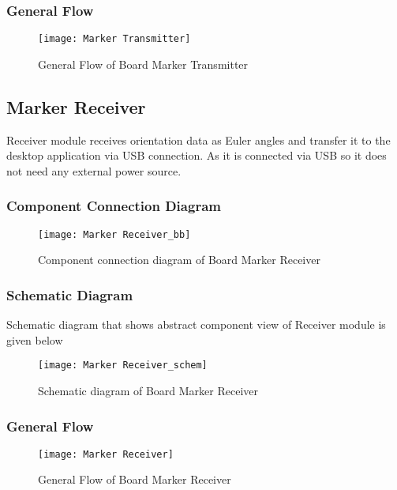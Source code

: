 \subsubsection{General Flow}

\begin{figure}[h]
  \centering
  \texttt{[image: Marker Transmitter]}
  \caption{General Flow of Board Marker Transmitter}
\end{figure}


\subsection{Marker Receiver}
Receiver module receives orientation data as Euler angles and transfer it to the desktop application via USB connection. As it is connected via USB so it does not need any external power source.

\subsubsection{Component Connection Diagram}

\begin{figure}[h]
  \centering
  \texttt{[image: Marker Receiver\_bb]}
  \caption{Component connection diagram of Board Marker Receiver}
\end{figure}

\subsubsection{Schematic Diagram}
Schematic diagram that shows abstract component view of Receiver module is given below

\begin{figure}[h]
  \centering
  \texttt{[image: Marker Receiver\_schem]}
  \caption{Schematic diagram of Board Marker Receiver}
\end{figure}
\newpage
\subsubsection{General Flow}
\begin{figure}[h]
  \centering
  \texttt{[image: Marker Receiver]}
  \caption{General Flow of Board Marker Receiver}
\end{figure}


